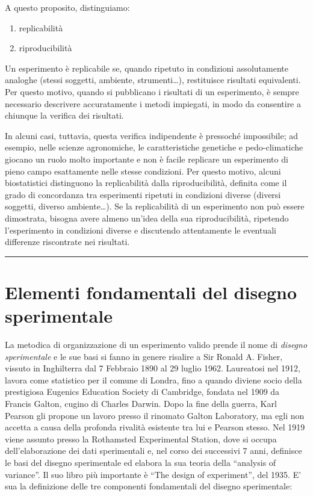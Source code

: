 \documentclass[a4paper,12pt,oneside]{book}
\providecommand{\tightlist}{%
  \setlength{\itemsep}{0pt}\setlength{\parskip}{0pt}}
\begin{document}
A questo proposito, distinguiamo:

\begin{enumerate}
\def\labelenumi{\arabic{enumi}.}
\tightlist
\item
  replicabilità
\item
  riproducibilità
\end{enumerate}

Un esperimento è replicabile se, quando ripetuto in condizioni assolutamente analoghe (stessi soggetti, ambiente, strumenti\ldots), restituisce risultati equivalenti. Per questo motivo, quando si pubblicano i risultati di un esperimento, è sempre necessario descrivere accuratamente i metodi impiegati, in modo da consentire a chiunque la verifica dei risultati.

In alcuni casi, tuttavia, questa verifica indipendente è pressoché impossibile; ad esempio, nelle scienze agronomiche, le caratteristiche genetiche e pedo-climatiche giocano un ruolo molto importante e non è facile replicare un esperimento di pieno campo esattamente nelle stesse condizioni. Per questo motivo, alcuni biostatistici distinguono la replicabilità dalla riproducibilità, definita come il grado di concordanza tra esperimenti ripetuti in condizioni diverse (diversi soggetti, diverso ambiente\ldots). Se la replicabilità di un esperimento non può essere dimostrata, bisogna avere almeno un'idea della sua riproducibilità, ripetendo l'esperimento in condizioni diverse e discutendo attentamente le eventuali differenze riscontrate nei risultati.

\begin{center}\rule{0.5\linewidth}{0.5pt}\end{center}

\hypertarget{elementi-fondamentali-del-disegno-sperimentale}{%
\section{Elementi fondamentali del disegno sperimentale}\label{elementi-fondamentali-del-disegno-sperimentale}}

La metodica di organizzazione di un esperimento valido prende il nome di \emph{disegno sperimentale} e le sue basi si fanno in genere risalire a Sir Ronald A. Fisher, vissuto in Inghilterra dal 7 Febbraio 1890 al 29 luglio 1962. Laureatosi nel 1912, lavora come statistico per il comune di Londra, fino a quando diviene socio della prestigiosa Eugenics Education Society di Cambridge, fondata nel 1909 da Francis Galton, cugino di Charles Darwin. Dopo la fine della guerra, Karl Pearson gli propone un lavoro presso il rinomato Galton Laboratory, ma egli non accetta a causa della profonda rivalità esistente tra lui e Pearson stesso. Nel 1919 viene assunto presso la Rothamsted Experimental Station, dove si occupa dell'elaborazione dei dati sperimentali e, nel corso dei successivi 7 anni, definisce le basi del disegno sperimentale ed elabora la sua teoria della ``analysis of variance''. Il suo libro più importante è ``The design of experiment'', del 1935. E' sua la definizione delle tre componenti fondamentali del disegno sperimentale:
\end{document}
